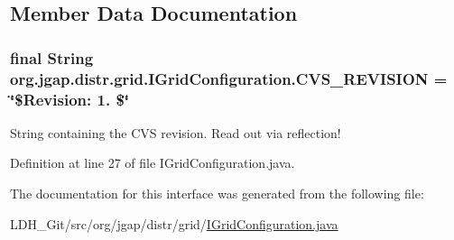 \subsection{Member Data Documentation}
\hypertarget{interfaceorg_1_1jgap_1_1distr_1_1grid_1_1_i_grid_configuration_ad8cc715c7081403fccd494b9d0683f32}{
\subsubsection[{C\-V\-S\-\_\-\-R\-E\-V\-I\-S\-I\-O\-N}]{\setlength{\rightskip}{0pt plus 5cm}final String org.\-jgap.\-distr.\-grid.\-I\-Grid\-Configuration.\-C\-V\-S\-\_\-\-R\-E\-V\-I\-S\-I\-O\-N = \char`\"{}\$Revision\-: 1. \$\char`\"{}\hspace{0.3cm}{\ttfamily [static]}}}\label{interfaceorg_1_1jgap_1_1distr_1_1grid_1_1_i_grid_configuration_ad8cc715c7081403fccd494b9d0683f32}
String containing the C\-V\-S revision. Read out via reflection! 

Definition at line 27 of file I\-Grid\-Configuration.\-java.



The documentation for this interface was generated from the following file\-:\begin{DoxyCompactItemize}
\item 
L\-D\-H\-\_\-\-Git/src/org/jgap/distr/grid/\hyperlink{_i_grid_configuration_8java}{I\-Grid\-Configuration.\-java}\end{DoxyCompactItemize}
